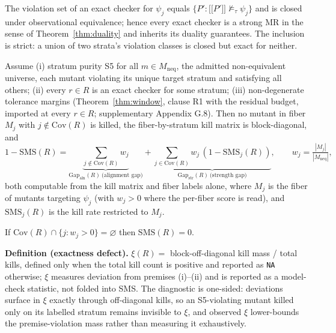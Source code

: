 \documentclass[manuscript,screen,review]{acmart}
\begin{document}
\begin{lemma}\label{lem:closure}
The violation set of an exact checker for $\psi_j$ equals
$\{P' : \mathopen{\lbrack\!\lbrack} P' \mathclose{\rbrack\!\rbrack} \not\models_{\tau} \psi_j\}$
and is closed under observational equivalence; hence every exact checker
is a strong MR in the sense of Theorem~\ref{thm:duality} and inherits
its duality guarantees. The inclusion is strict: a union of two strata's
violation classes is closed but exact for neither.
\end{lemma}

\begin{theorem}\label{thm:gap}
Assume (i) stratum purity S5 for all $m \in M_{\mathrm{neq}}$, the
admitted non-equivalent universe, each mutant violating its unique
target stratum and satisfying all others; (ii) every $r \in R$ is an
exact checker for some stratum; (iii) non-degenerate tolerance margins
(Theorem~\ref{thm:window}, clause R1 with the residual budget, imported
at every $r \in R$; supplementary Appendix G.8). Then no mutant in fiber
$M_j$ with $j \notin \mathrm{Cov}(R)$ is killed, the fiber-by-stratum
kill matrix is block-diagonal, and
\[ 1 - \mathrm{SMS}(R) = \underbrace{\textstyle\sum_{j \notin \mathrm{Cov}(R)} w_j}_{\mathrm{Gap}_{\mathrm{aln}}(R)\ \text{(alignment gap)}}
 + \underbrace{\textstyle\sum_{j \in \mathrm{Cov}(R)} w_j\,(1 - \mathrm{SMS}_j(R))}_{\mathrm{Gap}_{\mathrm{str}}(R)\ \text{(strength gap)}},
 \qquad w_j = \tfrac{|M_j|}{|M_{\mathrm{neq}}|}, \]
both computable from the kill matrix and fiber labels alone, where $M_j$
is the fiber of mutants targeting $\psi_j$ (with $w_j > 0$ where the
per-fiber score is read), and $\mathrm{SMS}_j(R)$ is the kill rate
restricted to $M_j$.
\end{theorem}

\begin{corollary}\label{cor:zero}
If $\mathrm{Cov}(R) \cap \{j : w_j > 0\} = \varnothing$ then
$\mathrm{SMS}(R) = 0$.
\end{corollary}

\textbf{Definition (exactness defect).} $\xi(R) =$ block-off-diagonal
kill mass / total kills, defined only when the total kill count is
positive and reported as \texttt{NA} otherwise; $\xi$ measures deviation
from premises (i)--(ii) and is reported as a model-check statistic, not
folded into SMS. The diagnostic is one-sided: deviations surface in
$\xi$ exactly through off-diagonal kills, so an S5-violating mutant
killed only on its labelled stratum remains invisible to $\xi$, and
observed $\xi$ lower-bounds the premise-violation mass rather than
measuring it exhaustively.
\end{document}
